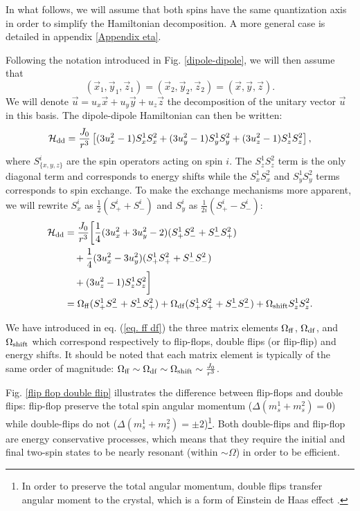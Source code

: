 \documentclass[a4paper, 11pt]{report}
\begin{document}
In what follows, we will assume that both spins have the same quantization axis in order to simplify the Hamiltonian decomposition. A more general case is detailed in appendix \ref{Appendix eta}.

Following the notation introduced in Fig. \ref{dipole-dipole}, we will then assume that $$(\vec{x}_1,\vec{y}_1,\vec{z}_1) = (\vec{x}_2,\vec{y}_2,\vec{z}_2) = (\vec{x},\vec{y},\vec{z}).$$ We will denote $\vec{u}=u_x \vec{x} + u_y \vec{y} + u_z \vec{z}$ the decomposition of the unitary vector $\vec{u}$ in this basis. The dipole-dipole Hamiltonian can then be written:
\begin{equation}
\mathcal{H}_{\rm dd}=\frac{J_0}{r^3}\left[ (3 u_x^2-1) S_x^1 S_x^2 + (3 u_y^2-1) S_y^1 S_y^2 + (3 u_z^2-1) S_z^1 S_z^2 \right],
\end{equation}
where $S_{\{x,y,z\} }^i$ are the spin operators acting on spin $i$. The $S_z^1 S_z^2$ term is the only diagonal term and corresponds to energy shifts while the $S_x^1 S_x^2$ and $S_y^1 S_y^2$ terms corresponds to spin exchange. To make the exchange mechanisms more apparent, we will rewrite $S_x^i$ as $\frac{1}{2}(S_+^i+S_-^i)$ and $S_y^i$ as $\frac{1}{2i}(S_+^i-S_-^i)$:
\begin{align}
\mathcal{H}_{\rm dd}&=\frac{J_0}{r^3}\bigg{[} \frac{1}{4}(3 u_x^2 + 3 u_y^2 -2)(S_+^1 S_-^2 + S_-^1 S_+^2) \nonumber \\
&\quad + \frac{1}{4}(3 u_x^2 - 3 u_y^2)(S_+^1 S_+^2 + S_-^1 S_-^2) \nonumber \\
&\quad +(3 u_z^2-1) S_z^1 S_z^2 \bigg{]} \nonumber \\
\medskip
&= \Omega_{\rm ff} (S_+^1 S_-^2 + S_-^1 S_+^2) + \Omega_{\rm df} (S_+^1 S_+^2 + S_-^1 S_-^2) + \Omega_{\rm shift} S_z^1 S_z^2. \label{eq. ff df}
\end{align}

We have introduced in eq. (\ref{eq. ff df}) the three matrix elements $\Omega_{\rm ff}$, $\Omega_{\rm df}$, and $\Omega_{\rm shift}$ which correspond respectively to flip-flops, double flips (or flip-flip) and energy shifts. It should be noted that each matrix element is typically of the same order of magnitude: $\Omega_{\rm ff} \sim \Omega_{\rm df} \sim \Omega_{\rm shift} \sim \frac{J_0}{r^3}$. 


Fig. \ref{flip flop double flip} illustrates the difference between flip-flops and double flips: flip-flop preserve the total spin angular momentum ($\Delta (m_s^1+m_s^2)=0$) while double-flips do not ($\Delta (m_s^1+m_s^2)=\pm 2$)\footnote{In order to preserve the total angular momentum, double flips transfer angular moment to the crystal, which is a form of Einstein de Haas effect \citep{einstein1915experimental}.}. Both double-flips and flip-flop are energy conservative processes, which means that they require the initial and final two-spin states to be nearly resonant (within $\sim \Omega$) in order to be efficient.
\end{document}
